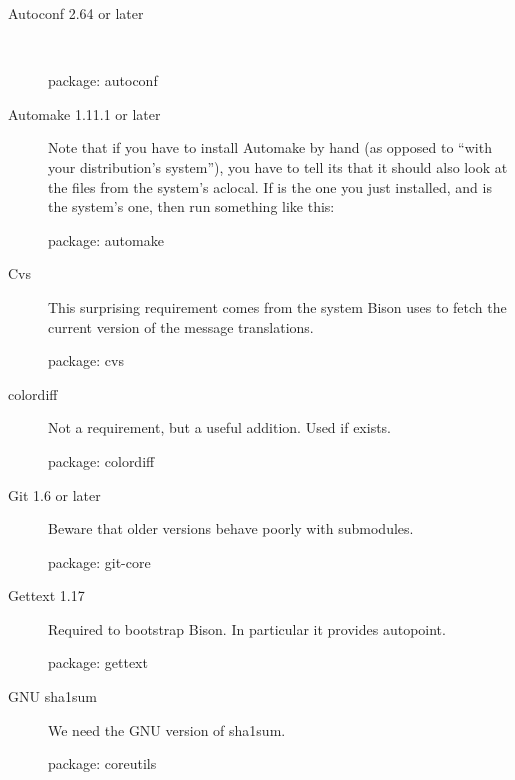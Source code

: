 \begin{description}
\item[Autoconf 2.64 or later]~\\

\begin{package}
package: autoconf
\end{package}

\item[Automake 1.11.1 or later] Note that if you have to install Automake by
  hand (as opposed to ``with your distribution's system''), you have to tell
  its  that it should also look at the files from the
  system's aclocal.  If  is the one you just
  installed, and  is the system's one, then run
  something like this:


\begin{package}
package: automake
\end{package}

\item[Cvs]
  This surprising requirement comes from the system Bison uses to fetch
  the current version of the message translations.
\begin{package}
package: cvs
\end{package}

\item[colordiff] Not a requirement, but a useful addition.  Used if exists.
\begin{package}
package: colordiff
\end{package}

\item[Git 1.6 or later]
  Beware that older versions behave poorly with submodules.
\begin{package}
package: git-core
\end{package}

\item[Gettext 1.17]
  Required to bootstrap Bison.  In particular it provides autopoint.
\begin{package}
package: gettext
\end{package}

\item[GNU sha1sum]
  We need the GNU version of sha1sum.
\begin{package}
package: coreutils
\end{package}


\end{description}
